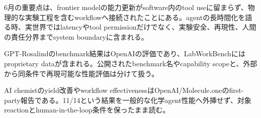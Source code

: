 6月の重要点は、frontier modelの能力更新がsoftware内のtool useに留まらず、物理的な実験工程を含むworkflowへ接続されたことにある。agentの長時間化を語る時、実世界ではlatencyやtool permissionだけでなく、実験安全、再現性、人間の責任分界までsystem boundaryに含まれる。\autocite{src-5ff2f715f1e6,src-ba562226725d}


\begin{claimboundary}
GPT-Rosalindのbenchmark結果はOpenAIの評価であり、LabWorkBenchにはproprietary dataが含まれる。公開されたbenchmark名やcapability scopeと、外部から同条件で再現可能な性能評価は分けて扱う。\autocite{src-ba562226725d}
\end{claimboundary}

\begin{claimboundary}
AI chemistのyield改善やworkflow effectivenessはOpenAI/Molecule.oneのfirst-party報告である。11/14という結果を一般的な化学agent性能へ外挿せず、対象reactionとhuman-in-the-loop条件を保ったまま読む。\autocite{src-5ff2f715f1e6}
\end{claimboundary}
